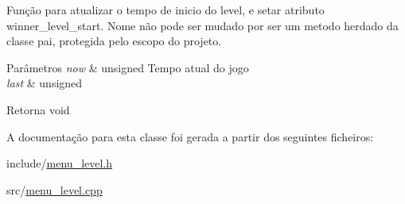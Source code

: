 Função para atualizar o tempo de inicio do level, e setar atributo winner\+\_\+level\+\_\+start. Nome não pode ser mudado por ser um metodo herdado da classe pai, protegida pelo escopo do projeto. 


\begin{DoxyParams}{Parâmetros}
{\em now} & unsigned Tempo atual do jogo \\
\hline
{\em last} & unsigned \\
\hline
\end{DoxyParams}
\begin{DoxyReturn}{Retorna}
void 
\end{DoxyReturn}


A documentação para esta classe foi gerada a partir dos seguintes ficheiros\+:\begin{DoxyCompactItemize}
\item 
include/\mbox{\hyperlink{menu__level_8h}{menu\+\_\+level.\+h}}\item 
src/\mbox{\hyperlink{menu__level_8cpp}{menu\+\_\+level.\+cpp}}\end{DoxyCompactItemize}
